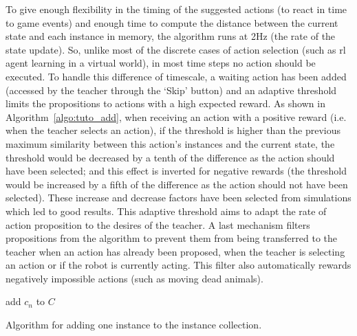 To give enough flexibility in the timing of the suggested actions (to react in time to game events) and enough time to compute the distance between the current state and each instance in memory, the algorithm runs at 2Hz (the rate of the state update). So, unlike most of the discrete cases of action selection (such as \gls{rl} agent learning in a virtual world), in most time steps no action should be executed. To handle this difference of timescale, a waiting action has been added (accessed by the teacher through the `Skip' button) and an adaptive threshold limits the propositions to actions with a high expected reward. As shown in Algorithm~\ref{algo:tuto_add}, when receiving an action with a positive reward (i.e. when the teacher selects an action), if the threshold is higher than the previous maximum similarity between this action's instances and the current state, the threshold would be decreased by a tenth of the difference as the action should have been selected; and this effect is inverted for negative rewards (the threshold would be increased by a fifth of the difference as the action should not have been selected). These increase and decrease factors have been selected from simulations which led to good results. This adaptive threshold aims to adapt the rate of action proposition to the desires of the teacher. A last mechanism filters propositions from the algorithm to prevent them from being transferred to the teacher when an action has already been proposed, when the teacher is selecting an action or if the robot is currently acting. This filter also automatically rewards negatively impossible actions (such as moving dead animals).

\begin{algorithm}
	\DontPrintSemicolon
	add	$c_n$ to $C$
	\caption{Algorithm for adding one instance to the instance collection.}
	\label{algo:tuto_add}
\end{algorithm}

